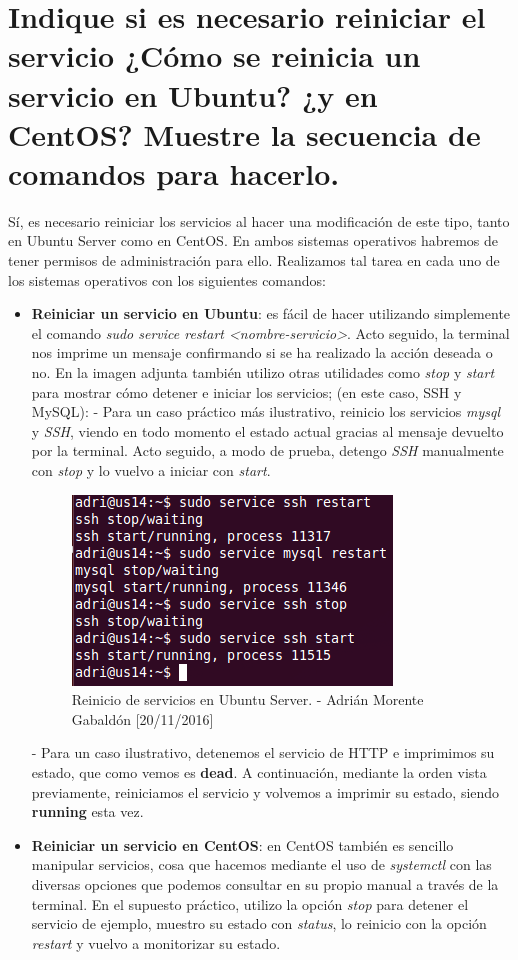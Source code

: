 \section{Indique si es necesario reiniciar el servicio ¿Cómo se reinicia un servicio en Ubuntu? ¿y en CentOS? Muestre la secuencia de comandos para hacerlo.}
Sí, es necesario reiniciar los servicios al hacer una modificación de este tipo, tanto en Ubuntu Server como en CentOS. En ambos sistemas operativos habremos de tener permisos de administración para ello. Realizamos tal tarea en cada uno de los sistemas operativos con los siguientes comandos:
\begin{itemize}
	\item \textbf{Reiniciar un servicio en Ubuntu}: es fácil de hacer utilizando simplemente el comando \emph{sudo service restart <nombre-servicio>}. Acto seguido, la terminal nos imprime un mensaje confirmando si se ha realizado la acción deseada o no. En la imagen adjunta también utilizo otras utilidades como \emph{stop} y \emph{start} para mostrar cómo detener e iniciar los servicios; (en este caso, SSH y MySQL):
	- Para un caso práctico más ilustrativo, reinicio los servicios \emph{mysql} y \emph{SSH}, viendo en todo momento el estado actual gracias al mensaje devuelto por la terminal. Acto seguido, a modo de prueba, detengo \emph{SSH} manualmente con \emph{stop} y lo vuelvo a iniciar con \emph{start}. 
	\begin{figure}[H]
		\centering
		\includegraphics[scale=0.75]{service-ubuntu}
		\caption{Reinicio de servicios en Ubuntu Server. - Adrián Morente Gabaldón [20/11/2016]}
		\label{fig:figura4}
	\end{figure}
	- Para un caso ilustrativo, detenemos el servicio de HTTP e imprimimos su estado, que como vemos es \textbf{dead}. A continuación, mediante la orden vista previamente, reiniciamos el servicio y volvemos a imprimir su estado, siendo \textbf{running} esta vez.
	\item \textbf{Reiniciar un servicio en CentOS}: en CentOS también es sencillo manipular servicios, cosa que hacemos mediante el uso de \emph{systemctl} con las diversas opciones que podemos consultar en su propio manual a través de la terminal. En el supuesto práctico, utilizo la opción \emph{stop} para detener el servicio de ejemplo, muestro su estado con \emph{status}, lo reinicio con la opción \emph{restart} y vuelvo a monitorizar su estado.

\end{itemize}

